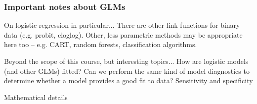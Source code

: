 \documentclass[table]{beamer}\usepackage[]{graphicx}\usepackage[]{color}
\begin{document}

\begin{frame}[fragile]
\frametitle{Important notes about GLMs}

\begin{block}{On logistic regression in particular...}
\bi
        \myitem There are other link functions for binary data (e.g. probit, cloglog).
        \myitem Other, less parametric methods may be appropriate here too -- e.g. CART, random forests, classification algorithms.
\ei
\end{block}

\begin{block}{Beyond the scope of this course, but interesting topics...}
\bi
        \myitem How are logistic models (and other GLMs) fitted?
        \myitem Can we perform the same kind of model diagnostics to determine whether a model provides a good fit to data?
        \myitem Sensitivity and specificity
        \ei
\end{block}

\end{frame}


% 
% 
% 
% 
% 
% 
% 


\begin{frame}[fragile]


\centering
\Large
Mathematical details


\end{frame}
\end{document}
